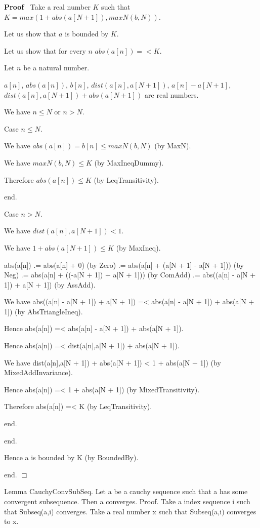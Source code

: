 \documentclass{article}
\newenvironment{forthel}{\begin{leftbar}}{\end{leftbar}}
\newenvironment{proof}{\noindent\textbf{Proof\ }}{\hspace*{\fill}$\Box$\medskip}
\begin{document}
\begin{forthel}
\begin{proof}
		Take a real number $K$ such that $K = max(1 + abs(a[N + 1]), maxN(b,N))$.
		
		Let us show that $a$ is bounded by $K$.
		
		Let us show that for every $n$ $abs(a[n]) =< K$. 
		
		Let $n$ be a natural number.
		
		$a[n]$, $abs(a[n])$, $b[n]$, $dist(a[n],a[N + 1])$, $a[n] - a[N + 1]$, $dist(a[n],a[N + 1]) + abs(a[N + 1])$ are real numbers.
		
		We have $n \leq N$ or $n > N$.
		
		Case $n \leq N$.
		
		We have $abs(a[n]) = b[n] \leq maxN(b,N)$ (by MaxN).
		
		We have $maxN(b,N) \leq K$ (by MaxIneqDummy).
		
		Therefore $abs(a[n]) \leq K$ (by LeqTransitivity).
		
		end.
		
		Case $n > N$.
		
		We have $dist(a[n],a[N + 1]) < 1$.
		
		We have $1 + abs(a[N + 1]) \leq K$ (by MaxIneq).
		
		abs(a[n]) .= abs(a[n] + 0) (by Zero)
		.= abs(a[n] + (a[N + 1] - a[N + 1])) (by Neg)
		.= abs(a[n] + ((-a[N + 1]) + a[N + 1])) (by ComAdd)
		.= abs((a[n] - a[N + 1]) + a[N + 1]) (by AssAdd).
		
		We have abs((a[n] - a[N + 1]) + a[N + 1]) =< abs(a[n] - a[N + 1]) + abs(a[N + 1]) (by AbsTriangleIneq).
		
		Hence abs(a[n]) =< abs(a[n] - a[N + 1]) + abs(a[N + 1]).
		
		Hence abs(a[n]) =< dist(a[n],a[N + 1]) + abs(a[N + 1]).
		
		We have dist(a[n],a[N + 1]) + abs(a[N + 1]) < 1 + abs(a[N + 1]) (by MixedAddInvariance).
		
		Hence abs(a[n]) =< 1 + abs(a[N + 1]) (by MixedTransitivity).
		
		Therefore abs(a[n]) =< K (by LeqTransitivity).
		
		end.
		
		end.
		
		Hence a is bounded by K (by BoundedBy).
		
		end.
	\end{proof}
	
	Lemma CauchyConvSubSeq.
	Let a be a cauchy sequence such that a has some convergent subsequence. Then a converges.
	Proof.
	Take a index sequence i such that Subseq(a,i) converges.
	Take a real number x such that Subseq(a,i) converges to x.
	

\end{forthel}
\end{document}
